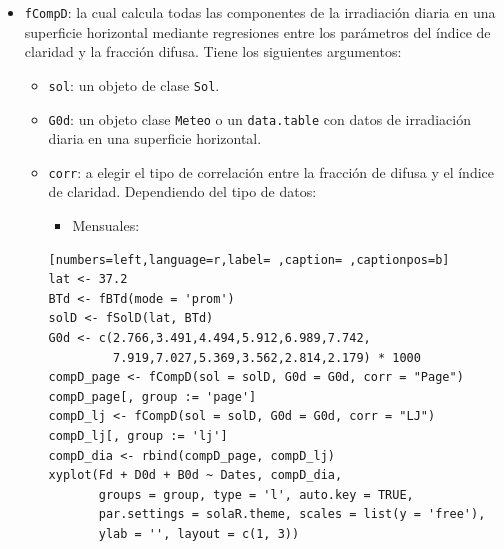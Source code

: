 \begin{itemize}
\item \texttt{fCompD}: la cual calcula todas las componentes de la irradiación diaria en una superficie horizontal mediante regresiones entre los parámetros del índice de claridad y la fracción difusa.
Tiene los siguientes argumentos:
\begin{itemize}
\item \texttt{sol}: un objeto de clase \texttt{Sol}.
\item \texttt{G0d}: un objeto clase \texttt{Meteo} o un \texttt{data.table} con datos de irradiación diaria en una superficie horizontal.
\item \texttt{corr}: a elegir el tipo de correlación entre la fracción de difusa y el índice de claridad.
Dependiendo del tipo de datos:
\begin{itemize}
\item Mensuales:
\end{itemize}
\begin{lstlisting}[numbers=left,language=r,label= ,caption= ,captionpos=b]
lat <- 37.2
BTd <- fBTd(mode = 'prom')
solD <- fSolD(lat, BTd)
G0d <- c(2.766,3.491,4.494,5.912,6.989,7.742,
         7.919,7.027,5.369,3.562,2.814,2.179) * 1000
compD_page <- fCompD(sol = solD, G0d = G0d, corr = "Page")
compD_page[, group := 'page']
compD_lj <- fCompD(sol = solD, G0d = G0d, corr = "LJ")
compD_lj[, group := 'lj']
compD_dia <- rbind(compD_page, compD_lj)
xyplot(Fd + D0d + B0d ~ Dates, compD_dia,
       groups = group, type = 'l', auto.key = TRUE,
       par.settings = solaR.theme, scales = list(y = 'free'),
       ylab = '', layout = c(1, 3))

\end{lstlisting}


\end{itemize}
\end{itemize}
